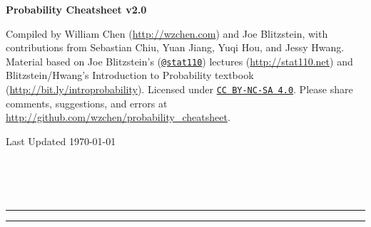 \documentclass[10pt,landscape]{article}
\begin{document}
\raggedright
\footnotesize
\begin{multicols*}{3}

\setlength{\premulticols}{1pt}
\setlength{\postmulticols}{1pt}
\setlength{\multicolsep}{1pt}
\setlength{\columnsep}{2pt}


\begin{center}
    {\color{blue} \Large{\textbf{Probability Cheatsheet v2.0}}} \\
\end{center}


\scriptsize

Compiled by William Chen (\url{http://wzchen.com}) and Joe Blitzstein, with contributions from Sebastian Chiu, Yuan Jiang, Yuqi Hou, and Jessy Hwang. Material based on Joe Blitzstein's (\texttt{\href{http://twitter.com/stat110}{@stat110}}) lectures (\url{http://stat110.net}) and Blitzstein/Hwang's Introduction to Probability textbook (\url{http://bit.ly/introprobability}). Licensed under \texttt{\href{http://creativecommons.org/licenses/by-nc-sa/4.0/}{CC BY-NC-SA 4.0}}. Please share comments, suggestions, and errors at \url{http://github.com/wzchen/probability_cheatsheet}.

\begin{center}
    Last Updated \today
\end{center}









  \hfill \\  
    \hfill \\   
     \hfill \\  
\smallskip \hrule height 2pt \smallskip
\smallskip \hrule height 2pt \smallskip

\end{multicols*}
\end{document}
